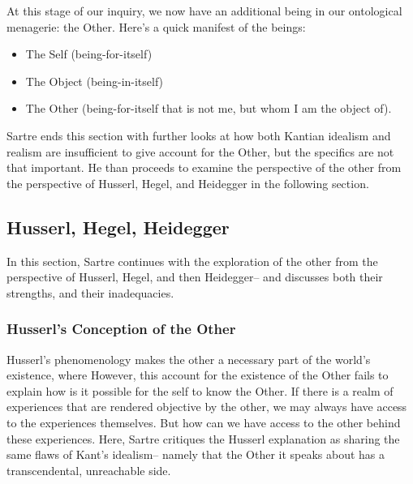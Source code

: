 At this stage of our inquiry, we now have an additional being in our ontological menagerie: the Other. Here's a quick manifest of the beings:

\begin{itemize}
  \item The Self (being-for-itself)
  \item The Object (being-in-itself)
  \item The Other (being-for-itself that is not me, but whom I am the object of).
\end{itemize}

\noindent
Sartre ends this section \autocite[316 -- 321]{sartre} with further looks at how both Kantian idealism and realism are insufficient to give account for the Other, but the specifics are not that important. He than proceeds to examine the perspective of the other from the perspective of Husserl, Hegel, and Heidegger in the following section.

\subsection{Husserl, Hegel, Heidegger}

In this section, Sartre continues with the exploration of the other from the perspective of Husserl, Hegel, and then Heidegger-- and discusses both their strengths, and their inadequacies.

\subsubsection*{Husserl's Conception of the Other}

Husserl's phenomenology makes the other a necessary part of the world's existence, where  However, this account for the existence of the Other fails to explain how is it possible for the self to know the Other.  If there is a realm of experiences that are rendered objective by the other, we may always have access to the experiences themselves. But how can we have access to the other behind these experiences. Here, Sartre critiques the Husserl explanation as sharing the same flaws of Kant's idealism-- namely that the Other it speaks about has a transcendental, unreachable side. 

